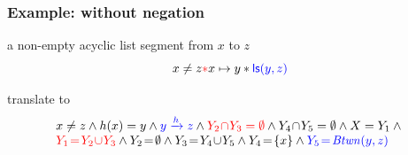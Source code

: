 \documentclass{beamer}
\begin{document}

\begin{frame}
  \frametitle{Example: without negation}
a non-empty acyclic list segment from $x$ to $z$
\[ x \neq z \textcolor{red}{*} x \mapsto y * \textcolor{blue}{\mathsf{ls}({y},{z})} \]

translate to
\[
\begin{array}{l}
x \neq z \land
\edge(x)=y \land
\textcolor{blue}{\reach{y}{z}} \land
\textcolor{red}{Y_2\!\cap\!Y_3 = \emptyset} \land
Y_4\!\cap\!Y_5 = \emptyset \land
X = Y_1 \land {} \\
\textcolor{red}{Y_1\!=\!Y_2\!\cup\!Y_3} \land
Y_2\!=\!\emptyset \land
Y_3\!=\!Y_4\!\cup\!Y_5 \land %
Y_4\!=\!\{x\} \land
\textcolor{blue}{Y_5\!=\!\Btwn(y,z)}
\end{array}
\]
\end{frame}
\end{document}

